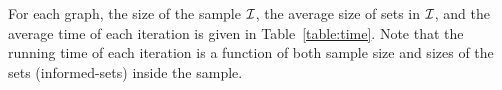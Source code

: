 For each graph, the size of the sample $\mathcal{I}$, the average size of sets in
$\mathcal{I}$, and the average time of each iteration is given in
Table~\ref{table:time}. Note that the running time of each iteration is a
function of both sample size and sizes of the sets (informed-sets) inside the
sample.


\begin{figure}[htbp]

\end{figure}
